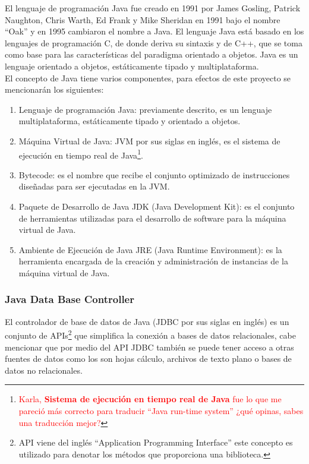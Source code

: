 El lenguaje de programación Java fue creado en 1991 por James Gosling, Patrick Naughton, Chris Warth, Ed Frank y Mike Sheridan en 1991 bajo el nombre ``Oak'' y en 1995 cambiaron el nombre a Java. El lenguaje Java está basado en los lenguajes de programación C, de donde deriva su sintaxis y de C++, que se toma como base para las características del paradigma orientado a objetos. Java es un lenguaje orientado a objetos, estáticamente tipado y multiplataforma\cite{JavaCompleteReference, WellGroundedJavaDeveloper}.\\
El concepto de Java tiene varios componentes, para efectos de este proyecto se mencionarán los siguientes\cite{JavaCompleteReference, WellGroundedJavaDeveloper}:
\begin{enumerate}
	\item Lenguaje de programación Java: previamente descrito, es un lenguaje multiplataforma, estáticamente tipado y orientado a objetos.
	\item Máquina Virtual de Java: JVM por sus siglas en inglés, es el sistema de ejecución en tiempo real de Java\footnote{\textcolor{red}{Karla, \textbf{Sistema de ejecución en tiempo real de Java} fue lo que me pareció más correcto para traducir ``Java run-time system'' ¿qué opinas, sabes una traducción mejor?}}.
	\item Bytecode: es el nombre que recibe el conjunto optimizado de instrucciones diseñadas para ser ejecutadas en la JVM.
	\item Paquete de Desarrollo de Java JDK (Java Development Kit): es el conjunto de herramientas utilizadas para el desarrollo de software para la máquina virtual de Java.
	\item Ambiente de Ejecución de Java JRE (Java Runtime Environment): es la herramienta encargada de la creación y administración de instancias de la máquina virtual de Java.
\end{enumerate}

\subsubsection{Java Data Base Controller}\label{sec-jdbc}
El controlador de base de datos de Java (JDBC por sus siglas en inglés) es un conjunto de APIs\footnote{API viene del inglés ``Application Programming Interface'' este concepto es utilizado para denotar los métodos que proporciona una biblioteca.} que simplifica la conexión a bases de datos relacionales, cabe mencionar que por medio del API JDBC también se puede tener acceso a otras fuentes de datos como los son hojas cálculo, archivos de texto plano o bases de datos no relacionales\cite{JDBCRecipes, BeginingJava8APIs}.

